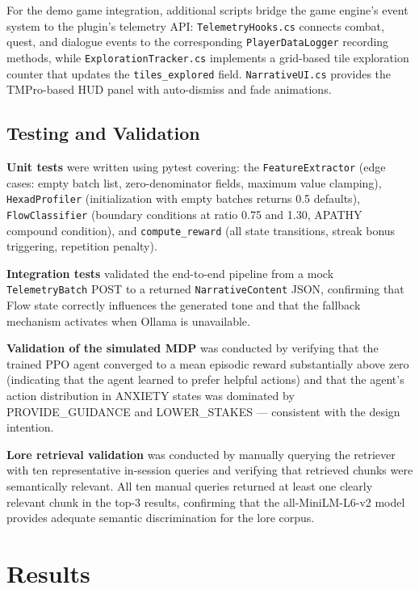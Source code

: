 \documentclass[12pt,a4paper]{report}
\begin{document}
For the demo game integration, additional scripts bridge the game engine's event system to the plugin's telemetry API: \texttt{TelemetryHooks.cs} connects combat, quest, and dialogue events to the corresponding \texttt{PlayerDataLogger} recording methods, while \texttt{ExplorationTracker.cs} implements a grid-based tile exploration counter that updates the \texttt{tiles\_explored} field. \texttt{NarrativeUI.cs} provides the TMPro-based HUD panel with auto-dismiss and fade animations.

\section{Testing and Validation}

\textbf{Unit tests} were written using pytest covering: the \texttt{FeatureExtractor} (edge cases: empty batch list, zero-denominator fields, maximum value clamping), \texttt{HexadProfiler} (initialization with empty batches returns 0.5 defaults), \texttt{FlowClassifier} (boundary conditions at ratio 0.75 and 1.30, APATHY compound condition), and \texttt{compute\_reward} (all state transitions, streak bonus triggering, repetition penalty).

\textbf{Integration tests} validated the end-to-end pipeline from a mock \texttt{TelemetryBatch} POST to a returned \texttt{NarrativeContent} JSON, confirming that Flow state correctly influences the generated tone and that the fallback mechanism activates when Ollama is unavailable.

\textbf{Validation of the simulated MDP} was conducted by verifying that the trained PPO agent converged to a mean episodic reward substantially above zero (indicating that the agent learned to prefer helpful actions) and that the agent's action distribution in ANXIETY states was dominated by PROVIDE\_GUIDANCE and LOWER\_STAKES --- consistent with the design intention.

\textbf{Lore retrieval validation} was conducted by manually querying the retriever with ten representative in-session queries and verifying that retrieved chunks were semantically relevant. All ten manual queries returned at least one clearly relevant chunk in the top-3 results, confirming that the all-MiniLM-L6-v2 model provides adequate semantic discrimination for the lore corpus.


\chapter{Results}
\end{document}
